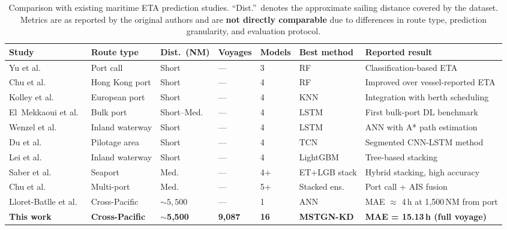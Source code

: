 \documentclass[conference]{IEEEtran}
\begin{document}
\begin{table}[t]
    \centering
    \caption{Comparison with existing maritime ETA prediction studies. ``Dist.''~denotes the approximate sailing distance covered by the dataset. Metrics are as reported by the original authors and are \textbf{not directly comparable} due to differences in route type, prediction granularity, and evaluation protocol.}
    \label{tab:lit_comparison}
    \footnotesize
    \setlength{\tabcolsep}{3pt}
    \renewcommand{\arraystretch}{1.15}
    \begin{tabular}{P{2.5cm} P{1.5cm} P{1.7cm} P{1.5cm} P{1.2cm} P{2.0cm} P{3.8cm}}
        \toprule
        \textbf{Study} & \textbf{Route type} & \textbf{Dist.\ (NM)} & \textbf{Voyages} & \textbf{Models} & \textbf{Best method} & \textbf{Reported result} \\
        \midrule
        Yu et al.~\cite{yuShipArrivalPrediction2018} & Port call & Short & --- & 3 & RF & Classification-based ETA \\
        Chu et al.~\cite{chuEvaluationPredictionPunctuality2023} & Hong Kong port & Short & --- & 4 & RF & Improved over vessel-reported ETA \\
        Kolley et al.~\cite{kolleyRobustBerthScheduling2022} & European port & Short & --- & 4 & KNN & Integration with berth scheduling \\
        El~Mekkaoui et al.~\cite{elmekkaouiDeepLearningModels2022} & Bulk port & Short--Med. & --- & 4 & LSTM & First bulk-port DL benchmark \\
        Wenzel et al.~\cite{wenzelNeuralNetworkApproach2023} & Inland waterway & Short & --- & 4 & LSTM & ANN with A* path estimation \\
        Du et al.~\cite{duSegmentedETAPrediction2025} & Pilotage area & Short & --- & 4 & TCN & Segmented CNN-LSTM method \\
        Lei et al.~\cite{leiPredictingVesselArrival2024} & Inland waterway & Short & --- & 4 & LightGBM & Tree-based stacking \\
        Saber et al.~\cite{saberHighaccuracyPredictionVessels2025} & Seaport & Med. & --- & 4+ & ET+LGB stack & Hybrid stacking, high accuracy \\
        Chu et al.~\cite{chuVesselArrivalTime2025} & Multi-port & Med. & --- & 5+ & Stacked ens. & Port call + AIS fusion \\
        Lloret-Batlle et al.~\cite{lloretbatlle2025} & Cross-Pacific & ${\sim}5{,}500$ & --- & 1 & ANN & MAE $\approx$ 4\,h at 1{,}500\,NM from port \\
        \midrule
        \textbf{This work} & \textbf{Cross-Pacific} & $\boldsymbol{\sim}$\textbf{5,500} & \textbf{9,087} & \textbf{16} & \textbf{MSTGN-KD} & \textbf{MAE = 15.13\,h (full voyage)} \\
        \bottomrule
    \end{tabular}
\end{table}
\end{document}
